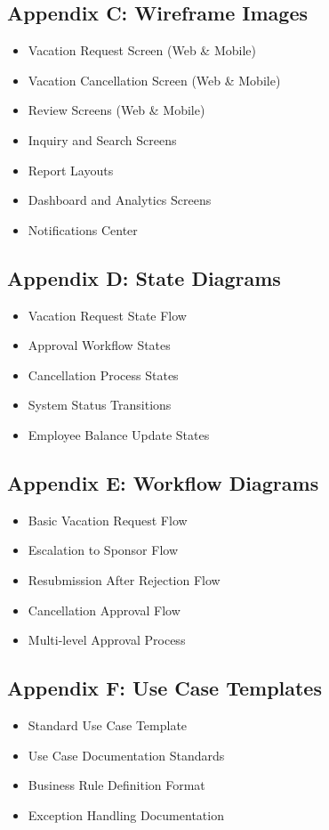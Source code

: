 \documentclass[12pt,a4paper]{article}
\begin{document}
\subsection{Appendix C: Wireframe Images}
\begin{itemize}
    \item Vacation Request Screen (Web \& Mobile)
    \item Vacation Cancellation Screen (Web \& Mobile)
    \item Review Screens (Web \& Mobile)
    \item Inquiry and Search Screens
    \item Report Layouts
    \item Dashboard and Analytics Screens
    \item Notifications Center
\end{itemize}

\subsection{Appendix D: State Diagrams}
\begin{itemize}
    \item Vacation Request State Flow
    \item Approval Workflow States
    \item Cancellation Process States
    \item System Status Transitions
    \item Employee Balance Update States
\end{itemize}

\subsection{Appendix E: Workflow Diagrams}
\begin{itemize}
    \item Basic Vacation Request Flow
    \item Escalation to Sponsor Flow
    \item Resubmission After Rejection Flow
    \item Cancellation Approval Flow
    \item Multi-level Approval Process
\end{itemize}

\subsection{Appendix F: Use Case Templates}
\begin{itemize}
    \item Standard Use Case Template
    \item Use Case Documentation Standards
    \item Business Rule Definition Format
    \item Exception Handling Documentation
\end{itemize}
\end{document}
